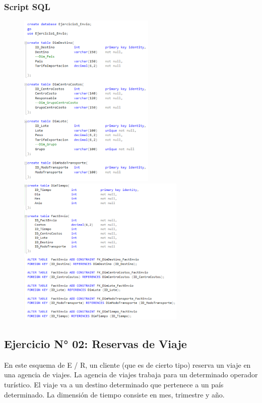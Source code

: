 \documentclass[12pt,letterpaper]{article}
\begin{document}
\subsubsection{\textbf{Script SQL }}

	\begin{figure}[htb]
		\begin{center}
			\includegraphics[width=6.5cm]{./Imagenes/Ejercicio1_script1}
			\includegraphics[width=8cm]{./Imagenes/Ejercicio1_script2}
		\end{center}
	\end{figure}

\newpage


\subsection{Ejercicio N° 02: Reservas de Viaje}

En este esquema de E / R, un cliente (que es de cierto tipo) reserva un viaje en una agencia de viajes. La agencia de viajes trabaja para un determinado operador turístico. El viaje va a un destino determinado que pertenece a un país determinado. La dimensión de tiempo consiste en mes, trimestre y año.
\end{document}
